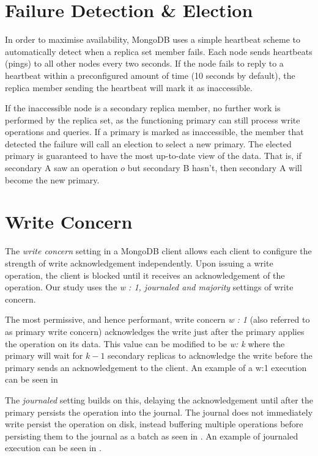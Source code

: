 \section{Failure Detection \& Election}
\label{sec:election}
In order to maximise availability, MongoDB uses a simple heartbeat scheme to automatically detect when a replica set member fails. Each node sends heartbeats (pings) to all other nodes every two seconds. If the node fails to reply to a heartbeat within a preconfigured amount of time (10 seconds by default), the replica member sending the heartbeat will mark it as inaccessible. 

If the inaccessible node is a secondary replica member, no further work is performed by the replica set, as the functioning primary can still process write operations and queries. If a primary is marked as inaccessible, the member that detected the failure will call an election to select a new primary. The elected primary is guaranteed to have the most up-to-date view of the data. That is, if secondary A saw an operation $o$ but secondary B hasn't, then secondary A will become the new primary.

\section{Write Concern}
\label{sec:writeconcern}
The \textit{write concern} setting in a MongoDB client allows each client to configure the strength of write acknowledgement independently. Upon issuing a write operation, the client is blocked until it receives an acknowledgement of the operation. Our study uses the \textit{w : 1, journaled and majority} settings of write concern.

The most permissive, and hence performant, write concern \textit{w : 1} (also referred to as primary write concern) acknowledges the write just after the primary applies the operation on its data. This value can be modified to be \textit{w: k} where the primary will wait for $k-1$ secondary replicas to acknowledge the write before the primary sends an acknowledgement to the client. An example of a w:1 execution can be seen in 

The \textit{journaled} setting builds on this, delaying the acknowledgement until after the primary persists the operation into the journal. The journal does not immediately write persist the operation on disk, instead buffering multiple operations before persisting them to the journal as a batch as seen in . An example of journaled execution can be seen in .

